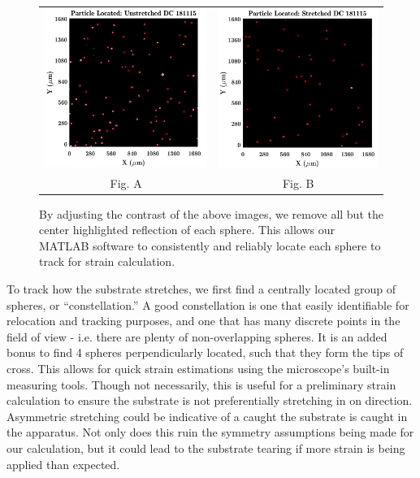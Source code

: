 \begin{figure}[h!]
	\begin{tabular}{cc}
		\includegraphics[width= .5\linewidth]{Chapters/Figures/particle_located_unstretched.pdf} & \includegraphics[width= .5\linewidth]{Chapters/Figures/particle_located_stretched.pdf}\\
		Fig. A & Fig. B
	\end{tabular}
	\caption[Particle-Locating for Stretch Calibration]{By adjusting the contrast of the above images, we remove all but the center highlighted reflection of each sphere. This allows our MATLAB software to consistently and reliably locate each sphere to track for strain calculation.}
	\label{fig:particleTracking}
\end{figure}


To track how the substrate stretches, we first find a centrally located group of spheres, or ``constellation.'' A good constellation is one that easily identifiable for relocation and tracking purposes, and one that has many discrete points in the field of view - i.e. there are plenty of non-overlapping spheres. It is an added bonus to find 4 spheres perpendicularly located, such that they form the tips of cross. This allows for quick strain estimations using the microscope's built-in measuring tools. Though not necessarily, this is useful for a preliminary strain calculation to ensure the substrate is not preferentially stretching in on direction. Asymmetric stretching could be indicative of a caught  the substrate is caught in the apparatus. Not only does this ruin the symmetry assumptions being made for our calculation, but it could lead to the substrate tearing if more strain is being applied than expected.

